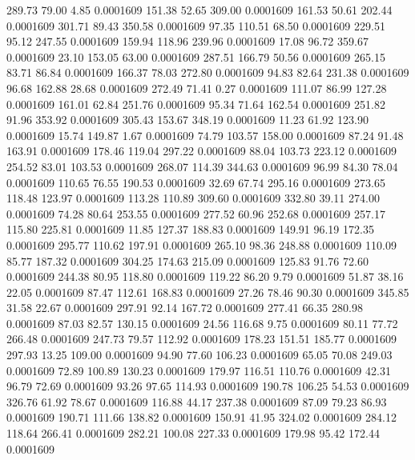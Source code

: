  289.73   79.00    4.85   0.0001609
 151.38   52.65  309.00   0.0001609
 161.53   50.61  202.44   0.0001609
 301.71   89.43  350.58   0.0001609
  97.35  110.51   68.50   0.0001609
 229.51   95.12  247.55   0.0001609
 159.94  118.96  239.96   0.0001609
  17.08   96.72  359.67   0.0001609
  23.10  153.05   63.00   0.0001609
 287.51  166.79   50.56   0.0001609
 265.15   83.71   86.84   0.0001609
 166.37   78.03  272.80   0.0001609
  94.83   82.64  231.38   0.0001609
  96.68  162.88   28.68   0.0001609
 272.49   71.41    0.27   0.0001609
 111.07   86.99  127.28   0.0001609
 161.01   62.84  251.76   0.0001609
  95.34   71.64  162.54   0.0001609
 251.82   91.96  353.92   0.0001609
 305.43  153.67  348.19   0.0001609
  11.23   61.92  123.90   0.0001609
  15.74  149.87    1.67   0.0001609
  74.79  103.57  158.00   0.0001609
  87.24   91.48  163.91   0.0001609
 178.46  119.04  297.22   0.0001609
  88.04  103.73  223.12   0.0001609
 254.52   83.01  103.53   0.0001609
 268.07  114.39  344.63   0.0001609
  96.99   84.30   78.04   0.0001609
 110.65   76.55  190.53   0.0001609
  32.69   67.74  295.16   0.0001609
 273.65  118.48  123.97   0.0001609
 113.28  110.89  309.60   0.0001609
 332.80   39.11  274.00   0.0001609
  74.28   80.64  253.55   0.0001609
 277.52   60.96  252.68   0.0001609
 257.17  115.80  225.81   0.0001609
  11.85  127.37  188.83   0.0001609
 149.91   96.19  172.35   0.0001609
 295.77  110.62  197.91   0.0001609
 265.10   98.36  248.88   0.0001609
 110.09   85.77  187.32   0.0001609
 304.25  174.63  215.09   0.0001609
 125.83   91.76   72.60   0.0001609
 244.38   80.95  118.80   0.0001609
 119.22   86.20    9.79   0.0001609
  51.87   38.16   22.05   0.0001609
  87.47  112.61  168.83   0.0001609
  27.26   78.46   90.30   0.0001609
 345.85   31.58   22.67   0.0001609
 297.91   92.14  167.72   0.0001609
 277.41   66.35  280.98   0.0001609
  87.03   82.57  130.15   0.0001609
  24.56  116.68    9.75   0.0001609
  80.11   77.72  266.48   0.0001609
 247.73   79.57  112.92   0.0001609
 178.23  151.51  185.77   0.0001609
 297.93   13.25  109.00   0.0001609
  94.90   77.60  106.23   0.0001609
  65.05   70.08  249.03   0.0001609
  72.89  100.89  130.23   0.0001609
 179.97  116.51  110.76   0.0001609
  42.31   96.79   72.69   0.0001609
  93.26   97.65  114.93   0.0001609
 190.78  106.25   54.53   0.0001609
 326.76   61.92   78.67   0.0001609
 116.88   44.17  237.38   0.0001609
  87.09   79.23   86.93   0.0001609
 190.71  111.66  138.82   0.0001609
 150.91   41.95  324.02   0.0001609
 284.12  118.64  266.41   0.0001609
 282.21  100.08  227.33   0.0001609
 179.98   95.42  172.44   0.0001609
